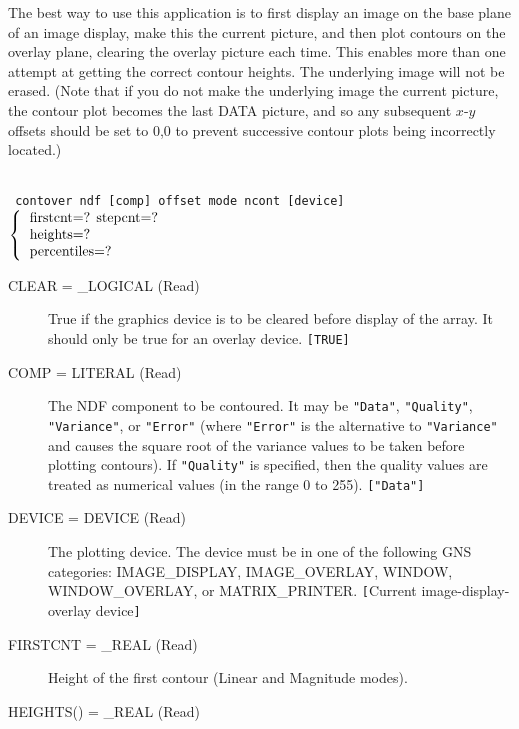 \documentclass[twoside,11pt]{article}
\newcommand{\htmlref}[2]{#1}
\newcommand{\sstusage}[1]{\pagebreak[3] \item[Usage:] \mbox{} \\[1.3ex] {\ssttt #1}}
\newcommand{\sstparameters}[1]{
   \goodbreak 
   \item[Parameters:] \mbox{} \\
   \vspace{-3.5ex}
   \begin{description}
      #1
   \end{description}
}
\newcommand{\sstsubsection}[1]{ \item[{#1}] \mbox{} \\}
\newcommand{\ssttt}{\tt}
\renewcommand{\sstusage}[1]{\htmlref{\item[Usage:]}{ap:usage} \mbox{} \\ {\ssttt #1}}
\renewcommand{\sstparameters}[1]{
      \htmlref{\item[Parameters:]}{se:param}
      \begin{description}
         #1
      \end{description}
   }
\renewcommand{\sstsubsection}[1]{\item[{#1}]}
\begin{document}
{{      The best way to use this application is to first display an image
      on the base plane of an image display, make this the current
      picture, and then plot contours on the overlay plane, clearing
      the overlay picture each time. This enables more than one attempt
      at getting the correct contour heights.  The underlying image will
      not be erased. (Note that if you do not make the underlying image
      the current picture, the contour plot becomes the last DATA
      picture, and so any subsequent $x$-$y$ offsets should be set to 0,0 to
      prevent successive contour plots being incorrectly located.)
   }
   \sstusage{
      contover ndf [comp] offset mode ncont [device]
        \newline\hspace*{1.5em}
        $\left\{ {\begin{tabular}{l}
                    firstcnt=? stepcnt=? \\
                    heights=? \\
                    percentiles=?
                   \end{tabular} }
        \right.$
        \newline\hspace*{1.9em}
        \makebox[0mm][c]{\small mode}
   }
   \sstparameters{
      \sstsubsection{
         CLEAR = \_LOGICAL (Read)
      }{
         True if the graphics device is to be cleared before display
         of the array. It should only be true for an overlay device.
         {\tt [TRUE]}
      }
      \sstsubsection{
         COMP = LITERAL (Read)
      }{
         The NDF component to be contoured.  It may be {\tt "Data"},
         {\tt "Quality"}, {\tt "Variance"}, or {\tt "Error"} (where
         {\tt "Error"} is the alternative to {\tt "Variance"} and causes
         the square root of the variance values to be taken before
         plotting contours).  If {\tt "Quality"} is specified, then
         the quality values are treated as numerical values (in the
         range 0 to 255).  {\tt ["Data"]}
      }
      \sstsubsection{
         DEVICE = DEVICE (Read)
      }{
         The plotting device. The device must be in one of the following
         GNS categories: IMAGE\_DISPLAY, IMAGE\_OVERLAY, WINDOW,
         WINDOW\_OVERLAY, or MATRIX\_PRINTER.
         {\tt [}Current image-display-overlay device{\tt ]}
      }
      \sstsubsection{
         FIRSTCNT = \_REAL (Read)
      }{
         Height of the first contour (Linear and Magnitude modes).
      }
      \sstsubsection{
         HEIGHTS() = \_REAL (Read)
}}}
\end{document}
